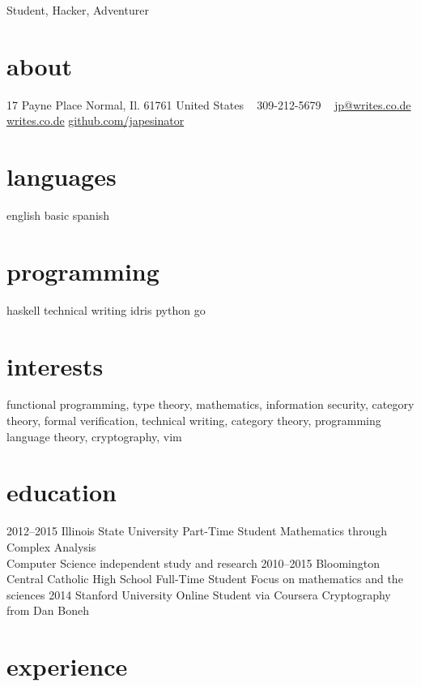 \documentclass[]{friggeri-cv}
\begin{document}
       {Student, Hacker, Adventurer}


\begin{aside}
  \section{about}
    17 Payne Place
    Normal, Il. 61761
    United States
    ~
    309-212-5679
    ~
    \href{mailto:jp@writes.co.de}{jp@writes.co.de}
    \href{http://writes.co.de}{writes.co.de}
    \href{http://github.com/japesinator}{github.com/japesinator}
  \section{languages}
    english
    basic spanish
  \section{programming}
    haskell
    technical writing
    idris
    python
    go
\end{aside}

\section{interests}

functional programming, type theory, mathematics, information security,
category theory, formal verification, technical writing, category theory,
programming language theory, cryptography, vim

\section{education}

\begin{entrylist}
  \entry
    {2012–2015}
    {Illinois State University}
    {Part-Time Student}
    {Mathematics through Complex Analysis\\
    Computer Science independent study and research}
  \entry
    {2010–2015}
    {Bloomington Central Catholic High School}
    {Full-Time Student}
    {Focus on mathematics and the sciences}
  \entry
    {2014}
    {Stanford University}
    {Online Student via Coursera}
    {Cryptography from Dan Boneh}
\end{entrylist}

\section{experience}
\end{document}
